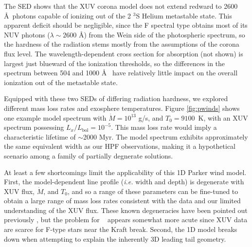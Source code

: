 \documentclass[twocolumn]{aastex631}
\newcommand{\hatpb}{\object{HAT-P-67 b}}
\begin{document}
The SED shows that the XUV corona model does not extend redward to 2600 \AA~photons capable of ionizing out of the 2 $^3$S Helium metastable state.  This apparent deficit should be negligible, since the F spectral type obtains most of its NUV photons ($\lambda\sim2600$ \AA) from the Wein side of the photospheric spectrum, so the hardness of the radiation stems mostly from the assumptions of the corona flux level.  The wavelength-dependent cross section for absorption (not shown) is largest just blueward of the ionization thresholds, so the differences in the spectrum between 504 and 1000 \AA~ have relatively little impact on the overall ionization out of the metastable state.

Equipped with these two SEDs of differing radiation hardness, we explored different mass loss rates and exosphere temperatures.  Figure \ref{fig:pwinds} shows one example model spectrum with $\dot{M} = 10^{13}$ g/s, and $T_0=9100$~K, with an XUV spectrum possessing $L_x/L_\mathrm{bol}=10^{-5}$.  This mass loss rate would imply a characteristic lifetime of $\sim$2000 Myr.  The model spectrum exhibits approximately the same equivalent width as our HPF observations, making it a hypothetical scenario among a family of partially degnerate solutions.

At least a few shortcomings limit the applicability of this 1D Parker wind model.  First, the model-dependent line profile (\emph{i.e.} width and depth) is degenerate with XUV flux, $\dot{M}$, and $T_0$, and so a range of these parameters can be fine-tuned to obtain a large range of mass loss rates consistent with the data and our limited understanding of the XUV flux.  These known degeneracies have been pointed out previously \citep{2022AJ....164..234V,2019ApJ...881..133O}, but the problem for \hatpb~ appears somewhat more acute since XUV data are scarce for F-type stars near the Kraft break.  Second, the 1D model breaks down when attempting to explain the inherently 3D leading tail geometry.
\end{document}
